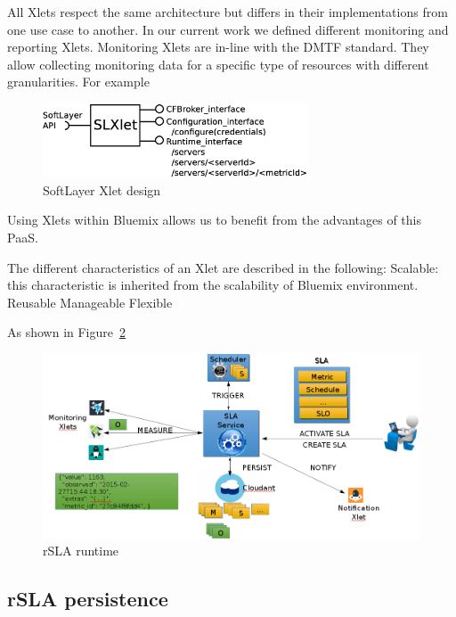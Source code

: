 All Xlets respect the same architecture but differs in their implementations from one use case to 
another. In our current work we defined different monitoring and reporting Xlets. Monitoring Xlets 
are in-line with the DMTF standard. They allow collecting monitoring data for a specific type of 
resources with different granularities. For example

\begin{figure}[H]
\centering
\hspace{1.5cm}
\includegraphics[width=0.7\textwidth]{pics/SLXlet}
\caption{\label{fig:slxlet} SoftLayer Xlet design}
\end{figure}
Using Xlets within Bluemix allows us to benefit from the advantages of this PaaS. 

The different characteristics of an Xlet are described in the following:
Scalable: this characteristic is inherited from the scalability of Bluemix environment.
Reusable 
Manageable
Flexible

As shown in Figure~\ref{fig:runtime}
\begin{figure}[H]
\centering
\includegraphics[width=\textwidth]{pics/runtime.png}
\caption{\label{fig:runtime} rSLA runtime}
\end{figure}

\subsection{rSLA persistence}
